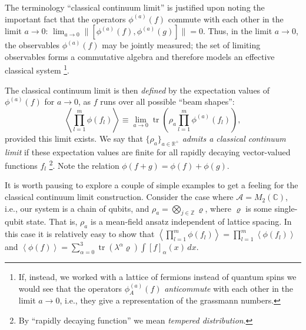 \documentclass[prl,twocolumn,lengthcheck,superscriptaddress]{revtex4-1}
\newcommand{\tr}{\operatorname{tr}}
\theoremstyle{definition}
\theoremstyle{remark}
\begin{document}
The terminology ``classical continuum limit'' is justified upon noting the important fact that the operators $\phi^{(a)}(f)$ commute with each other in the limit $a\rightarrow 0$: $\lim_{a\rightarrow 0}\|[\phi^{(a)}(f), \phi^{(a)}(g)]\| =  0$. Thus, in the limit $a\rightarrow 0$, the observables $\phi^{(a)}(f)$ may be jointly measured; the set of limiting observables forms a commutative algebra and therefore models an effective classical system \footnote{If, instead, we worked with a lattice of fermions instead of quantum spins we would see that the operators $\phi_{A}^{(a)}(f)$ \emph{anticommute} with each other in the limit $a\rightarrow 0$, i.e., they give a representation of the grassmann numbers.}.

The classical continuum limit is then \emph{defined} by the expectation values of $\phi^{(a)}(f)$ for $a\rightarrow 0$, as $f$ runs over all possible ``beam shapes'':
\begin{equation}
	\left\langle\prod_{l=1}^m\phi(f_l)\right\rangle \equiv \lim_{a\rightarrow 0} \tr\left(\rho_a \prod_{l=1}^m\phi^{(a)}(f_l)\right),
\end{equation}
provided this limit exists. We say that $\{\rho_a\}_{a\in\mathbb{R}^+}$ \emph{admits a classical continuum limit} if these expectation values are finite for all rapidly decaying vector-valued functions $f_l$ \footnote{By ``rapidly decaying function'' we mean \emph{tempered distribution}.}. Note the relation $\phi(f+g) = \phi(f) + \phi(g)$.

It is worth pausing to explore a couple of simple examples to get a feeling for the classical continuum limit construction. Consider the case where $\mathcal{A} = M_2(\mathbb{C})$, i.e., our system is a chain of qubits, and $\rho_a = \bigotimes_{j\in\mathbb{Z}} \varrho$, where $\varrho$ is some single-qubit state. That is, $\rho_a$ is a mean-field ansatz independent of lattice spacing. In this case it is relatively easy to show that $\left\langle\prod_{l=1}^m\phi(f_l)\right\rangle = \prod_{l=1}^m\left\langle\phi(f_l)\right\rangle$ and $\left\langle\phi(f)\right\rangle = \sum_{\alpha=0}^3\tr(\lambda^\alpha\varrho) \int [f]_\alpha(x) \, dx$.
\end{document}
